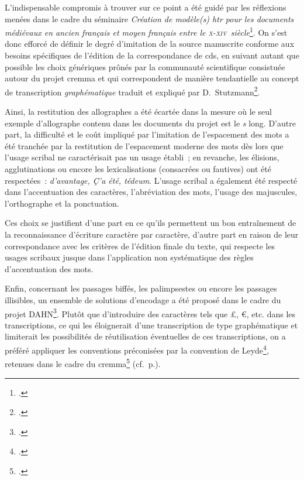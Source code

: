 \documentclass[a4paper,12pt,twoside]{book}
\newcommand{\siecle}[1]{\textsc{#1}\ieme}
\begin{document}
				L'indispensable compromis à trouver sur ce point a été guidé par les réflexions menées dans le cadre du séminaire \textit{Création de modèle(s) \gls{htr} pour les documents médiévaux en ancien français et moyen français entre le \siecle{x}-\siecle{xiv}~siècle}\footcite{pincheSeminaireCreationModele2021b}. On s'est donc efforcé de définir le degré d'imitation de la source manuscrite conforme aux besoins spécifiques de l'édition de la correspondance de \gls{cds}, en suivant autant que possible les choix génériques prônés par la communauté scientifique consistuée autour du projet \gls{cremma} et qui correspondent de manière tendantielle au concept de transcription \textit{graphématique} traduit et expliqué par D.~Stutzmann\footcite[p.~251]{stutzmannPaleographieStatistiquePour2011a}.
				
				Ainsi, la restitution des allographes a été écartée dans la mesure où le seul exemple d'allographe contenu dans les documents du projet est le \textit{s} long. D'autre part, la difficulté et le coût impliqué par l'imitation de l'espacement des mots a été tranchée par la restitution de l'espacement moderne des mots dès lors que l'usage scribal ne caractérisait pas un usage établi~; en revanche, les élisions, agglutinations ou encore les lexicalisations (consacrées ou fautives) ont été respectées~: \textit{d'avantage, Ç'a été, tédeum}. L'usage scribal a également été respecté dans l'accentuation des caractères, l'abréviation des mots, l'usage des majuscules, l'orthographe et la ponctuation.
				
				Ces choix se justifient d'une part en ce qu'ils permettent un bon entraînement de la reconnaissance d'écriture caractère par caractère, d'autre part en raison de leur correspondance avec les critères de l'édition finale du texte, qui respecte les usages scribaux jusque dans l'application non systématique des règles d'accentuation des mots.
				
				Enfin, concernant les passages biffés, les palimpsestes ou encore les passages illisibles, un ensemble de solutions d'encodage a été proposé dans le cadre du projet DAHN\footcite{chiffoleauFewTipsReading}. Plutôt que d'introduire des caractères tels que £, €, etc. dans les transcriptions, ce qui les éloignerait d'une transcription de type graphématique et limiterait les possibilités de réutilisation éventuelles de ces transcriptions, on a préféré appliquer les conventions préconisées par la convention de Leyde\footcite{leidenConvention}, retenues dans le cadre du \gls{cremma}\footcite{pincheSeminaireCreationModele2021a} (cf.~p.\pageref{biffes}).
				
\end{document}
